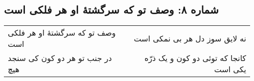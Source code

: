 \begin{center}
\section*{شماره ۸: وصف تو که سرگشتۀ او هر فلکی است}
\label{sec:008}
\begin{longtable}{l p{0.5cm} r}
وصف تو که سرگشتهٔ او هر فلکی است
&&
نه لایق سوز دل هر بی نمکی است
\\
در جنب تو هر دو کون کی سنجد هیچ
&&
کانجا که توئی دو کون و یک ذرّه یکی است
\\
\end{longtable}
\end{center}
